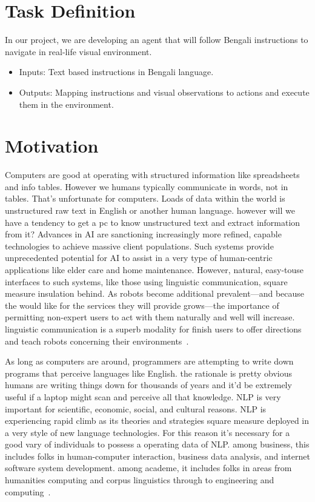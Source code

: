 \section{Task Definition}
In our project, we are developing an agent that will follow Bengali instructions to navigate in real-life visual environment.
\begin{itemize}
	\item Inputs: Text based instructions in Bengali language.
	\item Outputs: Mapping instructions and visual observations to actions and execute them in the environment.
\end{itemize}

\section{Motivation}
Computers are good at operating with structured information like spreadsheets and info tables. However we humans typically communicate in words, not in tables. That’s unfortunate for computers. Loads of data within the world is unstructured raw text in English or another human language. however will we have a tendency to get a pc to know unstructured text and extract information from it?
Advances in AI are sanctioning increasingly more refined, capable technologies to achieve massive client populations. Such systems provide unprecedented potential for AI to assist in a very type of human-centric applications like elder care and home maintenance. However, natural, easy-touse interfaces to such systems, like those using linguistic communication, square measure insulation behind. As robots become additional prevalent—and because the would like for the services they will provide grows—the importance of permitting non-expert users to act with them naturally and well will increase. linguistic communication is a superb modality for finish users to offer directions and teach robots concerning their environments~\cite{ijcai2018-810}. 

As long as computers are around, programmers are attempting to write down programs that perceive languages like English. the rationale is pretty obvious humans are writing things down for thousands of years and it'd be extremely useful if a laptop might scan and perceive all that knowledge.
NLP is very important for scientific, economic, social, and cultural reasons. NLP is experiencing rapid climb as its theories and strategies square measure deployed in a very style of new language technologies. For this reason it's necessary for a good vary of individuals to possess a operating data of NLP. among business, this includes folks in human-computer interaction, business data analysis, and internet software system development. among academe, it includes folks in areas from humanities computing and corpus linguistics through to engineering and computing~\cite{NLPbook}.
\newpage
